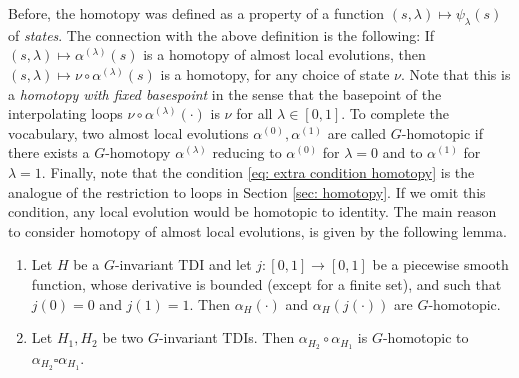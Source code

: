 Before, the homotopy was defined as a property of a function $(s,\lambda)\mapsto \psi_\lambda(s)$ of \emph{states}. The connection with the above definition is the following: If $(s,\lambda)\mapsto \alpha^{(\lambda)}(s)$ is a homotopy of almost local evolutions, then $(s,\lambda)\mapsto \nu\circ\alpha^{(\lambda)}(s)$ is a homotopy, for any choice of state $\nu$. Note that this is a \emph{homotopy with fixed basespoint} in the sense that the basepoint of the interpolating loops $\nu\circ\alpha^{(\lambda)}(\cdot)$ is $\nu$ for all $\lambda \in [0,1]$.
To complete the vocabulary, two almost local evolutions $\alpha^{(0)},\alpha^{(1)}$ are called $G$-homotopic if there exists a $G$-homotopy $\alpha^{(\lambda)}$ reducing to $\alpha^{(0)}$ for $\lambda=0$ and to $\alpha^{(1)}$ for $\lambda=1$.  
Finally, note that the condition \eqref{eq: extra condition homotopy} is the analogue of the restriction to loops in Section \ref{sec: homotopy}. If we omit this condition, any local evolution would be homotopic to identity.  
The main reason to consider homotopy of almost local evolutions, is given by the following lemma.
\begin{lemma}\label{lem: composition of loops is homotopic to concatenation}
	\begin{enumerate}
		\item Let $H$ be a $G$-invariant TDI and let $j: [0,1]\to [0,1]$ be a piecewise smooth function, whose derivative is bounded (except for a finite set), and such that $j(0)=0$ and $j(1)=1$. Then $\alpha_H(\cdot)$ and $\alpha_H(j(\cdot))$ are $G$-homotopic. 
		\item Let $H_1,H_2$ be two $G$-invariant TDIs.  Then $\alpha_{H_2} \circ \alpha_{H_1}$ is $G$-homotopic to~$\alpha_{H_2} \square \alpha_{H_1}$.
	\end{enumerate}
\end{lemma}
